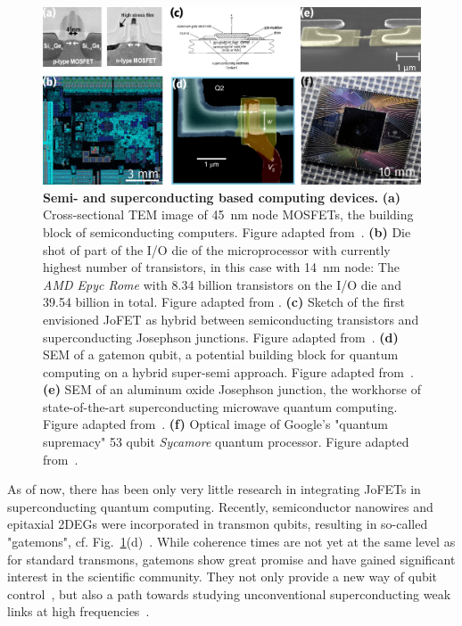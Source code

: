 \begin{figure}[t]
	\centering
	\includegraphics[width=\linewidth]{chapter-introduction/figs/intro_computing.svg.png}
	\caption{
		\textbf{Semi- and superconducting based computing devices.}
		\textbf{(a)} Cross-sectional TEM image of \SI{45}{\nano\meter} node MOSFETs, the building block of semiconducting computers.
		Figure adapted from~\cite{thompsonLogicNanotechnologyFeaturing2004}.
		\textbf{(b)} Die shot of part of the I/O die of the microprocessor with currently highest number of transistors, in this case with \SI{14}{\nano\meter} node: The \textit{AMD Epyc Rome} with \num{8.34} billion transistors on the I/O die and \num{39.54} billion in total.
		Figure adapted from \cite{fritzAMDRyzen36002019}.
		\textbf{(c)} Sketch of the first envisioned JoFET as hybrid between semiconducting transistors and superconducting Josephson junctions.
		Figure adapted from~\cite{clarkFeasibilityHybridJosephson1980}.
		\textbf{(d)} SEM of a gatemon qubit, a potential building block for quantum computing on a hybrid super-semi approach.
		Figure adapted from~\cite{casparisSuperconductingGatemonQubit2018}.
		\textbf{(e)} SEM of an aluminum oxide Josephson junction, the workhorse of state-of-the-art superconducting microwave quantum  computing.
		Figure adapted from~\cite{langfordExperimentallySimulatingDynamics2017}.
		\textbf{(f)} Optical image of Google's "quantum supremacy" 53 qubit \textit{Sycamore} quantum processor.
		Figure adapted from~\cite{shanklandTakeLookGoogle2020}. 
	}
	\label{fig:introcomputing}
\end{figure}

As of now, there has been only very little research in integrating JoFETs in superconducting quantum computing.
%
Recently, semiconductor nanowires and epitaxial 2DEGs were incorporated in transmon qubits, resulting in so-called "gatemons", cf. Fig.~\ref{fig:introcomputing}(d)~\cite{delangeRealizationMicrowaveQuantum2015,larsenSemiconductorNanowireBasedSuperconductingQubit2015,casparisGatemonBenchmarkingTwoQubit2016a,casparisSuperconductingGatemonQubit2018,luthiEvolutionNanowireTransmon2018}.
%
While coherence times are not yet at the same level as for standard transmons, gatemons show great promise and have gained significant interest in the scientific community.
%
They not only provide a new way of qubit control~\cite{shimSemiconductorinspiredDesignPrinciples2016}, but also a path towards studying unconventional superconducting weak links at high frequencies~\cite{tahanGrapheneQubitMotivates2019}.





